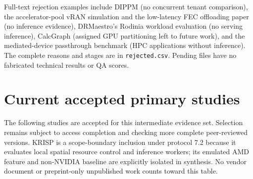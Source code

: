 \documentclass[12pt,a 4paper]{article}
\begin{document}
Full-text rejection examples include DIPPM (no concurrent tenant comparison), the accelerator-pool vRAN simulation and the low-latency FEC offloading paper (no inference evidence), DRMaestro's Rodinia workload evaluation (no serving inference), CalcGraph (assigned GPU partitioning left to future work), and the mediated-device passthrough benchmark (HPC applications without inference). The complete reasons and stages are in \texttt{rejected.csv}. Pending files have no fabricated technical results or QA scores.

\section{Current accepted primary studies}
The following studies are accepted for this intermediate evidence set. Selection remains subject to access completion and checking more complete peer-reviewed versions. KRISP is a scope-boundary inclusion under protocol 7.2 because it evaluates local spatial resource control and inference workers; its emulated AMD feature and non-NVIDIA baseline are explicitly isolated in synthesis. No vendor document or preprint-only unpublished work counts toward this table.
\end{document}
